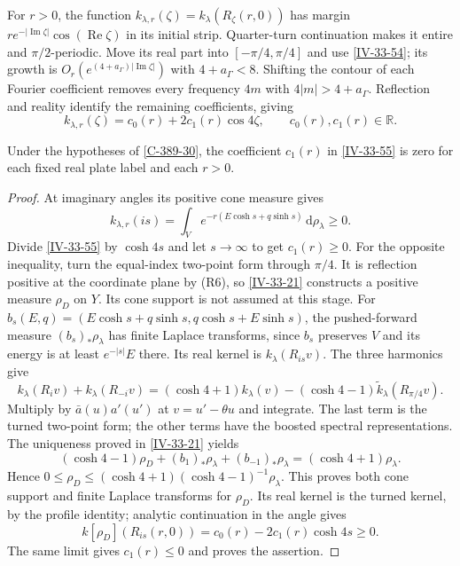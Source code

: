 \documentclass[11pt,letterpaper,reqno]{amsart}
\makeatletter
\theoremstyle{definition}
\newcommand{\ms@minorstart}{%
  \pushQED{\qed}\renewcommand{\qedsymbol}{$\blacksquare$}}
\newenvironment{proposition}[1][]{\ms@minorstart\ms@proposition[#1]}
  {\popQED\endms@proposition}
\theoremstyle{remark}
\makeatother
\begin{document}
For $r>0$, the function
$k_{\lambda,r}(\zeta)=k_\lambda(R_\zeta(r,0))$
has margin $re^{-|\operatorname{Im}\zeta|}\cos(\operatorname{Re}\zeta)$
in its initial strip. Quarter-turn continuation makes it
entire and $\pi/2$-periodic. Move its real part into
$[-\pi/4,\pi/4]$ and use \eqref{IV-33-54}; its growth is
$O_r(e^{(4+a_\Gamma)|\operatorname{Im}\zeta|})$ with
$4+a_\Gamma<8$. Shifting the contour of each Fourier
coefficient removes every frequency $4m$ with
$4|m|>4+a_\Gamma$. Reflection and reality identify the
remaining coefficients, giving
\begin{equation}\label{IV-33-55}
 k_{\lambda,r}(\zeta)=c_0(r)+2c_1(r)\cos4\zeta,
                         \qquad c_0(r),c_1(r)\in\mathbb R.
\end{equation}

\begin{proposition}[The fourth harmonic]\label{IV-33-57}
Under the hypotheses of \cref{C-389-30}, the coefficient
$c_1(r)$ in \eqref{IV-33-55} is zero for each fixed real
plate label and each $r>0$.
\end{proposition}
\begin{proof}
At imaginary angles its positive cone measure gives
\[
 k_{\lambda,r}(is)
   =\int_V e^{-r(E\cosh s+q\sinh s)}\,\mathrm{d}\rho_\lambda\ge0.
\]
Divide \eqref{IV-33-55} by $\cosh4s$ and let
$s\to\infty$ to get $c_1(r)\ge0$.
For the opposite inequality, turn the equal-index
two-point form through $\pi/4$. It is reflection positive
at the coordinate plane by (R6), so \cref{IV-33-21}
constructs a positive measure $\rho_D$ on $Y$.
Its cone support is not assumed at this stage.
For
$b_s(E,q)=(E\cosh s+q\sinh s,q\cosh s+E\sinh s)$,
the pushed-forward measure $(b_s)_*\rho_\lambda$ has
finite Laplace transforms, since $b_s$ preserves $V$
and its energy is at least $e^{-|s|}E$ there.
Its real kernel is $k_\lambda(R_{is}v)$.
The three harmonics give
\[
 k_\lambda(R_iv)+k_\lambda(R_{-i}v)
  =(\cosh4+1)k_\lambda(v)
           -(\cosh4-1)\widetilde k_\lambda(R_{\pi/4}v).
\]
Multiply by $\bar a(u)a'(u')$ at $v=u'-\theta u$ and
integrate. The last term is the turned two-point form;
the other terms have the boosted spectral representations.
The uniqueness proved in \cref{IV-33-21} yields
\begin{equation}\label{IV-33-63}
 (\cosh4-1)\rho_D+(b_1)_*\rho_\lambda+(b_{-1})_*\rho_\lambda
                              =(\cosh4+1)\rho_\lambda.
\end{equation}
Hence $0\le\rho_D\le(\cosh4+1)(\cosh4-1)^{-1}\rho_\lambda$.
This proves both cone support and finite Laplace transforms
for $\rho_D$. Its real kernel is the turned kernel, by
the profile identity; analytic continuation in the angle gives
\[
 k[\rho_D](R_{is}(r,0))=c_0(r)-2c_1(r)\cosh4s\ge0.
\]
The same limit gives $c_1(r)\le0$ and proves the assertion.
\end{proof}
\end{document}
